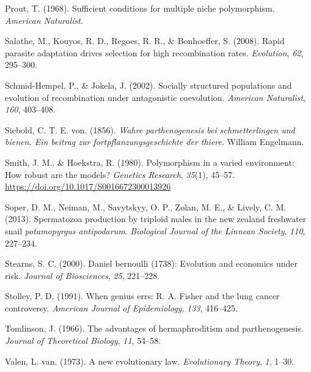 \documentclass[
  letterpaper,
]{book}
\newlength{\cslhangindent}
\newlength{\cslentryspacingunit} %
\newenvironment{CSLReferences}[2] %
 {%
  \setlength{\parindent}{0pt}
  \ifodd #1
  \let\oldpar\par
  \def\par{\hangindent=\cslhangindent\oldpar}
  \fi
  \setlength{\parskip}{#2\cslentryspacingunit}
 }%
 {}
\begin{document}
\begin{CSLReferences}{1}{0}
\leavevmode{}%
Prout, T. (1968). Sufficient conditions for multiple niche polymorphism.
\emph{American Naturalist}.

\leavevmode{}%
Salathe, M., Kouyos, R. D., Regoes, R. R., \& Bonhoeffer, S. (2008).
Rapid parasite adaptation drives selection for high recombination rates.
\emph{Evolution}, \emph{62}, 295--300.

\leavevmode{}%
Schmid-Hempel, P., \& Jokela, J. (2002). Socially structured populations
and evolution of recombination under antagonistic coevolution.
\emph{American Naturalist}, \emph{160}, 403--408.

\leavevmode{}%
Siebold, C. T. E. von. (1856). \emph{Wahre parthenogenesis bei
schmetterlingen und bienen. Ein beitrag zur fortpflanzungsgeschichte der
thiere}. William Engelmann.

\leavevmode{}%
Smith, J. M., \& Hoekstra, R. (1980). Polymorphism in a varied
environment: How robust are the models? \emph{Genetics Research},
\emph{35}(1), 45--57. \url{https://doi.org/10.1017/S0016672300013926}

\leavevmode{}%
Soper, D. M., Neiman, M., Savytskyy, O. P., Zolan, M. E., \& Lively, C.
M. (2013). Spermatozoa production by triploid males in the new zealand
freshwater snail \emph{potamopyrgus antipodarum}. \emph{Biological
Journal of the Linnean Society}, \emph{110}, 227--234.

\leavevmode{}%
Stearns, S. C. (2000). Daniel bernoulli (1738): Evolution and economics
under risk. \emph{Journal of Biosciences}, \emph{25}, 221--228.

\leavevmode{}%
Stolley, P. D. (1991). When genius errs: R. A. Fisher and the lung
cancer controversy. \emph{American Journal of Epidemiology}, \emph{133},
416--425.

\leavevmode{}%
Tomlinson, J. (1966). The advantages of hermaphroditism and
parthenogenesis. \emph{Journal of Theoretical Biology}, \emph{11},
54--58.

\leavevmode{}%
Valen, L. van. (1973). A new evolutionary law. \emph{Evolutionary
Theory}, \emph{1}, 1--30.


\end{CSLReferences}
\end{document}

